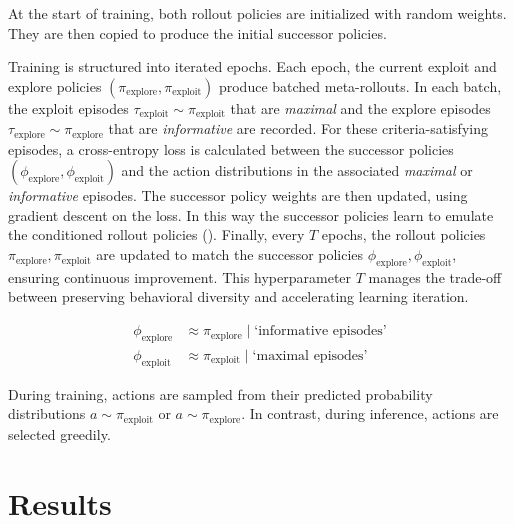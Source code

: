 \documentclass{article}
\begin{document}
At the start of training, both rollout policies are initialized with random weights. They are then copied to produce the initial successor policies.

Training is structured into iterated epochs. Each epoch, the current exploit and explore policies \((\pi_{\text{explore}}, \pi_{\text{exploit}})\) produce batched meta-rollouts. In each batch, the exploit episodes \(\tau_{\text{exploit}} \sim \pi_{\text{exploit}}\) that are \emph{maximal} and the explore episodes \(\tau_{\text{explore}} \sim \pi_{\text{explore}}\) that are \emph{informative} are recorded. 
%
For these criteria-satisfying episodes, a cross-entropy loss is calculated between the successor policies \((\phi_{\text{explore}}, \phi_{\text{exploit}})\) and the action distributions in the associated \emph{maximal} or \emph{informative} episodes.
%
The successor policy weights are then updated, using gradient descent on the loss. In this way the successor policies learn to emulate the conditioned rollout policies (). 
%
Finally, every \(T\) epochs, the rollout policies \(\pi_{\text{explore}}, \pi_{\text{exploit}}\) are updated to match the successor policies \(\phi_{\text{explore}}, \phi_{\text{exploit}}\), ensuring continuous improvement. This hyperparameter \(T\) manages the trade-off between preserving behavioral diversity and accelerating learning iteration.

\begin{align}
\phi_{\text{explore}} &\approx \pi_{\text{explore}} \mid \text{`informative episodes’}\nonumber\\
\phi_{\text{exploit}} &\approx \pi_{\text{exploit}} \mid \text{`maximal episodes’}
\label{eq2}
\end{align}

During training, actions are sampled from their predicted probability distributions \(a \sim \pi_\text{exploit}\) or \(a \sim \pi_\text{explore}\). In contrast, during inference, actions are selected greedily.

\section{Results}
\label{sec:results}
\FloatBarrier
\end{document}
